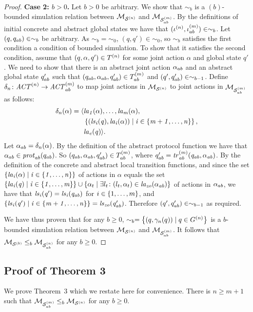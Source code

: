 \documentclass{article}
\newenvironment{customthm}[1]
  {\renewcommand\theinnercustomthm{#1}\innercustomthm}
  {\endinnercustomthm}
\begin{document}
\begin{proof}
{\bf Case 2: $b >0$.} Let $b > 0$ be arbitrary. 
     We
    show that $\sim_{b}$ is a $(b)$-bounded simulation relation  between
    $\mathcal{M}_{\mathcal{S}^{(n)}}$ and $\mathcal{M}_{\mathcal{S}_{ab}^{(m)}}$.  By the definitions of initial concrete and
    abstract global states we have that $(\iota^{({n})}, \iota^{({m})}_{ab}) \in
    \sim_{b}$.  Let $(q, q_{ab}) \in \sim_b$ be arbitrary. As $\sim_{b} =
    \sim_0$, $(q, q') \in \sim_0$, so $\sim_{b}$ satisfies the
    first condition a condition of bounded simulation. To show that
    it satisfies the second condition,  assume that $(q, \alpha, q') \in
    T^{(n)}$ for some joint action $\alpha$ and global state $q'$. We need
    to show that there is an abstract joint action $\alpha_{ab}$ and an abstract
    global state $q_{ab}'$ such that $(q_{ab}, \alpha_{ab}, q_{ab}') \in
    T^{(m)}_{ab}$ and $(q', q_{ab}') \in \sim_{b-1}$.  Define $\delta_n \colon
    \mathit{ACT}^{(n)} \rightarrow \mathit{ACT}^{(m)}_{ab}$ to map joint actions in $\mathcal{M}_{\mathcal{S}^{(n)}}$
    to joint actions in $\mathcal{M}_{\mathcal{S}_{ab}^{(m)}}$ as follows:
\begin{align*}
  \delta_n(\alpha) =  \langle &\it{la}_{1}({\alpha}), \ldots, \it{la}_{m}({\alpha}), \\
    &\left \{ (\it{ls}_{i}(q), \it{la}_{i}({\alpha})) \mid i \in \left \{ m + 1, \ldots, n \right \} \right \}, \\
  &\it{la}_{e}({q})  \rangle.
\end{align*}
Let $\alpha_{ab} = \delta_n(\alpha)$. By the definition of the abstract protocol
function we have that $\alpha_{ab} \in \mathit{prot}_{ab}(q_{ab})$. So $(q_{ab},
\alpha_{ab}, q_{ab}') \in T^{(m)}_{ab}$, where $q_{ab}' = \it{tr}^{(m)}_{ab}
(q_{ab}, \alpha_{ab})$. By the definition of the concrete and abstract local
transition functions, and since the set $\left \{ \it{la}_{i}({\alpha}) \mid i \in
\left \{ 1,\ldots,n \right \} \right \}$ of actions in $\alpha$ equals the set $\left \{ \it{la}_{i}({q}) \mid i
\in \left \{ 1,\ldots,m \right \} \right \} \cup \left \{ \alpha_t \mid \exists l_t \colon (l_t, \alpha_t)
\in \it{la}_{zo}({\alpha_{ab}}) \right \}$ of actions in $\alpha_{ab}$, we have that $\it{ls}_{i}(q') =
\it{ls}_{i}(q_{ab})$ for $i \in \left \{ 1,\ldots,m \right \}$, and $\left \{ \it{ls}_{i}(q') \mid i \in
\left \{ m+1,\ldots,n \right \} \right \} = \it{ls}_{zo}(q_{ab}')$.  Therefore $(q', q_{ab}') \in
    \sim_{b-1}$ as required.

We have thus proven that for any $b \geq 0$, $\sim_b = \left \{ (q, \gamma_n(q))
    \mid q \in G^{(n)}  \right \}$ is a $b$-bounded simulation relation between
    $\mathcal{M}_{\mathcal{S}^{(n)}}$ and $\mathcal{M}_{\mathcal{S}_{ab}^{(m)}}$. It follows that $\mathcal{M}_{\mathcal{S}^{(b)}} \leq_b \mathcal{M}_{\mathcal{S}_{ab}^{(n)}}$ for any
    $b \geq 0$.

\end{proof}


\subsection*{Proof of Theorem 3}
We prove Theorem~3 which we restate here for convenience.
\begin{customthm}{3}
There is $n \geq m+1$ such that $\mathcal{M}_{\mathcal{S}_{ab}^{(m)}} \leq_b \mathcal{M}_{\mathcal{S}^{(n)}}$ for any $b \geq 0$.
\end{customthm}
\end{document}
